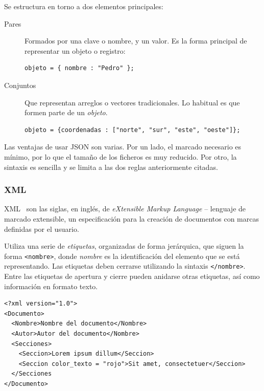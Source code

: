 Se estructura en torno a dos elementos principales:
\begin{description}
\item[Pares] Formados por una clave o nombre, y un valor. Es la forma principal
  de representar un objeto o registro:
  \begin{verbatim}
objeto = { nombre : "Pedro" };    
  \end{verbatim}
\item[Conjuntos] Que representan arreglos o vectores tradicionales. Lo habitual
  es que formen parte de un \textit{objeto}.
  \begin{verbatim}
objeto = {coordenadas : ["norte", "sur", "este", "oeste"]};
  \end{verbatim}
\end{description}

Las ventajas de usar JSON son varias. Por un lado, el marcado necesario es
mínimo, por lo que el tamaño de los ficheros es muy reducido. Por otro, la
sintaxis es sencilla y se limita a las dos reglas anteriormente citadas.

\subsubsection{XML}
\label{sec:diseno_xml}
XML~\cite{XMLSpec} son las siglas, en inglés, de \textit{eXtensible Markup
  Language} -- lenguaje de marcado extensible, un especificación para la
creación de documentos con marcas definidas por el usuario.

Utiliza una serie de \textit{etiquetas}, organizadas de forma jerárquica, que
siguen la forma \texttt{<nombre>}, donde \textit{nombre} es la identificación
del elemento que se está representando. Las etiquetas deben cerrarse utilizando
la sintaxis \texttt{</nombre>}. Entre las etiquetas de apertura y cierre pueden
anidarse otras etiquetas, así como información en formato texto.

\begin{verbatim}
<?xml version="1.0">
<Documento>
  <Nombre>Nombre del documento</Nombre>
  <Autor>Autor del documento</Nombre>
  <Secciones>
    <Seccion>Lorem ipsum dillum</Seccion>
    <Seccion color_texto = "rojo">Sit amet, consectetuer</Seccion>
  </Secciones
</Documento>  
\end{verbatim}

